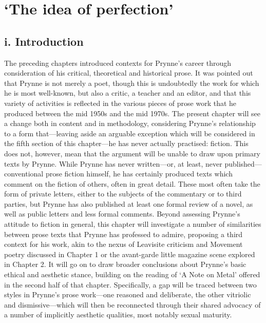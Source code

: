 \documentclass[]{article}
\begin{document}
\section{\texorpdfstring{`The idea of
perfection'}{The idea of perfection}}\label{the-idea-of-perfection}

\subsection{i. Introduction}\label{i.-introduction-2}

The preceding chapters introduced contexts for Prynne's career through
consideration of his critical, theoretical and historical prose. It was
pointed out that Prynne is not merely a poet, though this is undoubtedly
the work for which he is most well-known, but also a critic, a teacher
and an editor, and that this variety of activities is reflected in the
various pieces of prose work that he produced between the mid 1950s and
the mid 1970s. The present chapter will see a change both in content and
in methodology, considering Prynne's relationship to a form
that---leaving aside an arguable exception which will be considered in
the fifth section of this chapter---he has never actually practised:
fiction. This does not, however, mean that the argument will be unable
to draw upon primary texts by Prynne. While Prynne has never
written---or, at least, never published---conventional prose fiction
himself, he has certainly produced texts which comment on the fiction of
others, often in great detail. These most often take the form of private
letters, either to the subjects of the commentary or to third parties,
but Prynne has also published at least one formal review of a novel, as
well as public letters and less formal comments. Beyond assessing
Prynne's attitude to fiction in general, this chapter will investigate a
number of similarities between prose texts that Prynne has professed to
admire, proposing a third context for his work, akin to the nexus of
Leavisite criticism and Movement poetry discussed in Chapter 1 or the
avant-garde little magazine scene explored in Chapter 2. It will go on
to draw broader conclusions about Prynne's basic ethical and aesthetic
stance, building on the reading of `A Note on Metal' offered in the
second half of that chapter. Specifically, a gap will be traced between
two styles in Prynne's prose work---one reasoned and deliberate, the
other vitriolic and dismissive---which will then be reconnected through
their shared advocacy of a number of implicitly aesthetic qualities,
most notably sexual maturity.
\end{document}
